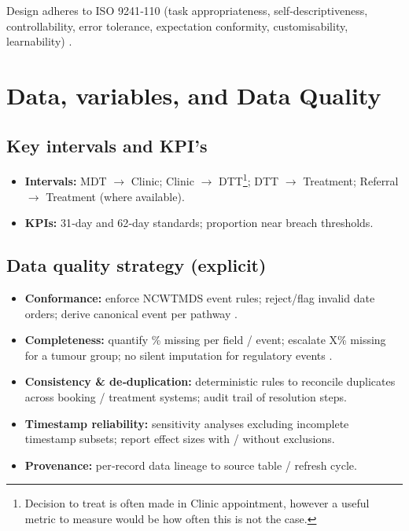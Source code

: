 \documentclass[12pt, a4paper, twoside]{article} %
\begin{document}
Design adheres to ISO 9241‑110 (task appropriateness, self‑descriptiveness, controllability, error tolerance, expectation conformity, customisability, learnability) \citep{ISO9241-2020}.


\section{Data, variables, and Data Quality}

\subsection{Key intervals and KPI's}

\begin{itemize}
\item \textbf{Intervals:} MDT $\rightarrow$ Clinic; Clinic $\rightarrow$ DTT\footnote{Decision to treat is often made in Clinic appointment, however a useful metric to measure would be how often this is not the case.}; DTT $\rightarrow$ Treatment; Referral $\rightarrow$ Treatment (where available).
\item \textbf{KPIs:} 31‑day and 62‑day standards; proportion near breach thresholds.\citep{johnson2024}
\end{itemize}

\subsection{Data quality strategy (explicit)}

\begin{itemize}
\item \textbf{Conformance:} enforce NCWTMDS event rules; reject/flag invalid date orders; derive canonical event per pathway \citep{NHSDigital2026}.
\item \textbf{Completeness:} quantify \% missing per field / event; escalate \> X\% missing for a tumour group; no silent imputation for regulatory events \citep{NHSDigital2026}.
\item \textbf{Consistency \& de‑duplication:} deterministic rules to reconcile duplicates across booking / treatment systems; audit trail of resolution steps.
\item \textbf{Timestamp reliability:} sensitivity analyses excluding incomplete timestamp subsets; report effect sizes with / without exclusions.
\item \textbf{Provenance:} per‑record data lineage to source table / refresh cycle.
\end{itemize}
\end{document}
